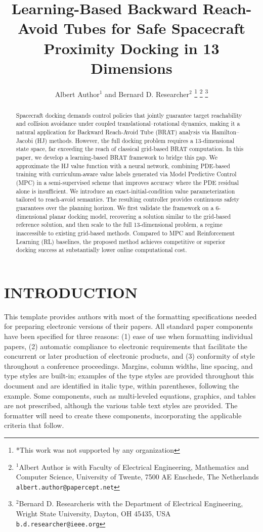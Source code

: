 \documentclass[letterpaper, 10 pt, conference]{ieeeconf}  %
\title{\LARGE \bf
Learning-Based Backward Reach-Avoid Tubes for Safe Spacecraft Proximity Docking in 13 Dimensions
}
\author{Albert Author$^{1}$ and Bernard D. Researcher$^{2}$%
\thanks{*This work was not supported by any organization}%
\thanks{$^{1}$Albert Author is with Faculty of Electrical Engineering, Mathematics and Computer Science,
        University of Twente, 7500 AE Enschede, The Netherlands
        {\tt\small albert.author@papercept.net}}%
\thanks{$^{2}$Bernard D. Researcheris with the Department of Electrical Engineering, Wright State University,
        Dayton, OH 45435, USA
        {\tt\small b.d.researcher@ieee.org}}%
}
\begin{document}
\maketitle
\thispagestyle{empty}
\pagestyle{empty}


\begin{abstract}
Spacecraft docking demands control policies that jointly guarantee target reachability and collision avoidance under coupled translational–rotational dynamics, making it a natural application for Backward Reach-Avoid Tube (BRAT) analysis via Hamilton–Jacobi (HJ) methods. However, the full docking problem requires a 13-dimensional state space, far exceeding the reach of classical grid-based BRAT computation. In this paper, we develop a learning-based BRAT framework to bridge this gap. We approximate the HJ value function with a neural network, combining PDE-based training with curriculum-aware value labels generated via Model Predictive Control (MPC) in a semi-supervised scheme that improves accuracy where the PDE residual alone is insufficient. We introduce an exact-initial-condition value parameterization tailored to reach-avoid semantics. The resulting controller provides continuous safety guarantees over the planning horizon. We first validate the framework on a 6-dimensional planar docking model, recovering a solution similar to the grid-based reference solution, and then scale to the full 13-dimensional problem, a regime inaccessible to existing grid-based methods. Compared to MPC and Reinforcement Learning (RL) baselines, the proposed method achieves competitive or superior docking success at substantially lower online computational cost.
\end{abstract}

\section{INTRODUCTION}

This template provides authors with most of the formatting specifications needed for preparing electronic versions of their papers. All standard paper components have been specified for three reasons: (1) ease of use when formatting individual papers, (2) automatic compliance to electronic requirements that facilitate the concurrent or later production of electronic products, and (3) conformity of style throughout a conference proceedings. Margins, column widths, line spacing, and type styles are built-in; examples of the type styles are provided throughout this document and are identified in italic type, within parentheses, following the example. Some components, such as multi-leveled equations, graphics, and tables are not prescribed, although the various table text styles are provided. The formatter will need to create these components, incorporating the applicable criteria that follow.
\end{document}
